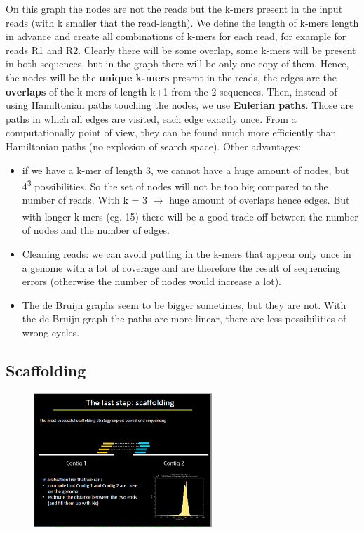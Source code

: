On this graph the nodes are not the reads but the k-mers present in the input reads (with k smaller that the read-length). We define the length of k-mers length in advance and create all combinations of k-mers for each read, for example for reads R1 and R2. Clearly there will be some overlap, some k-mers will be present in both sequences, but in the graph there will be only one copy of them.
Hence, the nodes will be the \textbf{unique k-mers} present in the reads, the edges are the \textbf{overlaps} of the k-mers of length k+1 from the 2 sequences.
Then, instead of using Hamiltonian paths touching the nodes, we use \textbf{Eulerian paths}. 
Those are paths in which all edges are visited, each edge exactly once. From a computationally point of view, they can be found much more efficiently than Hamiltonian paths (no explosion of search space).
Other advantages: 

\begin{itemize}
    \item if we have a k-mer of length 3, we cannot have a huge amount of nodes, but 4\textsuperscript{3} possibilities. So the set of nodes will not be too big compared to the number of reads. With k = 3 $\xrightarrow[]{}$ huge amount of overlaps hence edges. But with longer k-mers (eg. 15) there will be a good trade off between the number of nodes and the number of edges.
    \item Cleaning reads: we can avoid putting in the k-mers that appear only once in a genome with a lot of coverage and are therefore the result of sequencing errors (otherwise the number of nodes would increase a lot).
    \item The de Bruijn graphs seem to be bigger sometimes, but they are not. With the de Bruijn graph the paths are more linear, there are less possibilities of wrong cycles. 
\end{itemize}

\subsection{Scaffolding}

\begin{figure}[h]
\centering
\includegraphics[width=0.6\textwidth]{Scaffolding.png}
\caption{}
\end{figure}

